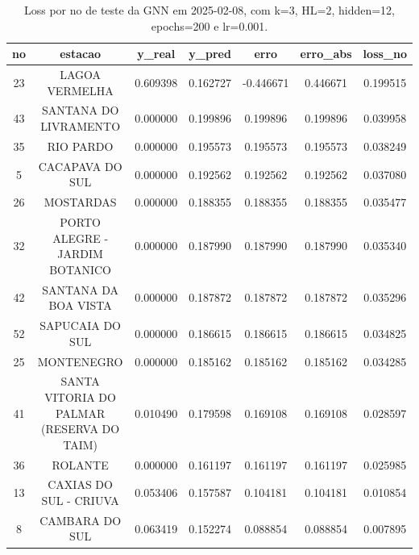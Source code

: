 \begin{table}[h]
\centering
\caption{Loss por no de teste da GNN em 2025-02-08, com k=3, HL=2, hidden=12, epochs=200 e lr=0.001.}
\label{tab:gnn_loss_k3_hl2_h12_e200_d20250208}
\begin{tabular}{ccccccc}
\toprule
no & estacao & y\_real & y\_pred & erro & erro\_abs & loss\_no \\
\midrule
23 & LAGOA VERMELHA & 0.609398 & 0.162727 & -0.446671 & 0.446671 & 0.199515 \\
43 & SANTANA DO LIVRAMENTO & 0.000000 & 0.199896 & 0.199896 & 0.199896 & 0.039958 \\
35 & RIO PARDO & 0.000000 & 0.195573 & 0.195573 & 0.195573 & 0.038249 \\
5 & CACAPAVA DO SUL & 0.000000 & 0.192562 & 0.192562 & 0.192562 & 0.037080 \\
26 & MOSTARDAS & 0.000000 & 0.188355 & 0.188355 & 0.188355 & 0.035477 \\
32 & PORTO ALEGRE - JARDIM BOTANICO & 0.000000 & 0.187990 & 0.187990 & 0.187990 & 0.035340 \\
42 & SANTANA DA BOA VISTA & 0.000000 & 0.187872 & 0.187872 & 0.187872 & 0.035296 \\
52 & SAPUCAIA DO SUL & 0.000000 & 0.186615 & 0.186615 & 0.186615 & 0.034825 \\
25 & MONTENEGRO & 0.000000 & 0.185162 & 0.185162 & 0.185162 & 0.034285 \\
41 & SANTA VITORIA DO PALMAR (RESERVA DO TAIM) & 0.010490 & 0.179598 & 0.169108 & 0.169108 & 0.028597 \\
36 & ROLANTE & 0.000000 & 0.161197 & 0.161197 & 0.161197 & 0.025985 \\
13 & CAXIAS DO SUL - CRIUVA & 0.053406 & 0.157587 & 0.104181 & 0.104181 & 0.010854 \\
8 & CAMBARA DO SUL & 0.063419 & 0.152274 & 0.088854 & 0.088854 & 0.007895 \\
\bottomrule
\end{tabular}
\end{table}
